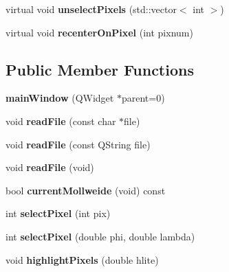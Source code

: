 \begin{DoxyCompactItemize}
\item 
\hypertarget{classmainWindow_a4031dfe47253a8ec780225ef380133a5}{
virtual void {\bfseries unselectPixels} (std::vector$<$ int $>$)}
\label{classmainWindow_a4031dfe47253a8ec780225ef380133a5}

\item 
\hypertarget{classmainWindow_a5e0f3bbb51121ed9c80443e5a659090e}{
virtual void {\bfseries recenterOnPixel} (int pixnum)}
\label{classmainWindow_a5e0f3bbb51121ed9c80443e5a659090e}

\end{DoxyCompactItemize}
\subsection*{Public Member Functions}
\begin{DoxyCompactItemize}
\item 
\hypertarget{classmainWindow_a2c09a8baf94af0cc5109fcf2ef97b12a}{
{\bfseries mainWindow} (QWidget $\ast$parent=0)}
\label{classmainWindow_a2c09a8baf94af0cc5109fcf2ef97b12a}

\item 
\hypertarget{classmainWindow_a587de90625aceafea7a5d05605383acf}{
void {\bfseries readFile} (const char $\ast$file)}
\label{classmainWindow_a587de90625aceafea7a5d05605383acf}

\item 
\hypertarget{classmainWindow_a81e610bbde3233d14966b2dac654060f}{
void {\bfseries readFile} (const QString file)}
\label{classmainWindow_a81e610bbde3233d14966b2dac654060f}

\item 
\hypertarget{classmainWindow_a4ba1da55179de9e414c3745584ccaed1}{
void {\bfseries readFile} (void)}
\label{classmainWindow_a4ba1da55179de9e414c3745584ccaed1}

\item 
\hypertarget{classmainWindow_a2f532e9ddef012506c6128513df28fc0}{
bool {\bfseries currentMollweide} (void) const }
\label{classmainWindow_a2f532e9ddef012506c6128513df28fc0}

\item 
\hypertarget{classmainWindow_ae1ccbdeeca3a2cfcf7364fdcec327c97}{
int {\bfseries selectPixel} (int pix)}
\label{classmainWindow_ae1ccbdeeca3a2cfcf7364fdcec327c97}

\item 
\hypertarget{classmainWindow_ace94d70e1f2a64ea0ca7dbfa7bb7566e}{
int {\bfseries selectPixel} (double phi, double lambda)}
\label{classmainWindow_ace94d70e1f2a64ea0ca7dbfa7bb7566e}

\item 
\hypertarget{classmainWindow_a6ef82fe94c9bec2d7901526896a1919d}{
void {\bfseries highlightPixels} (double hlite)}
\label{classmainWindow_a6ef82fe94c9bec2d7901526896a1919d}

\end{DoxyCompactItemize}
